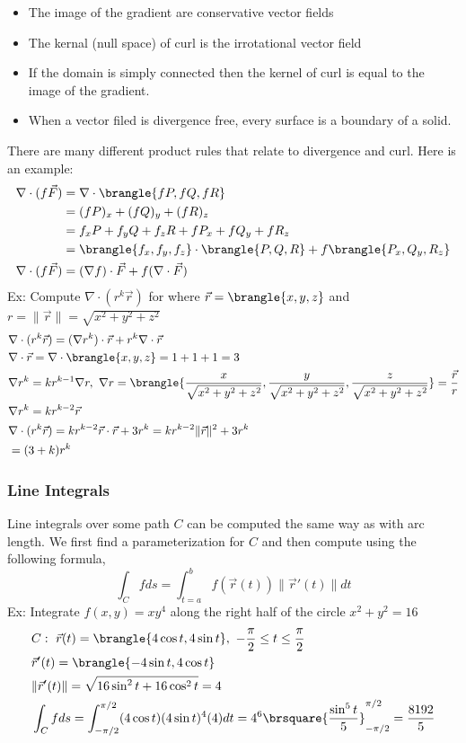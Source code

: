 \begin{itemize}
    \item The image of the gradient are conservative vector fields
    \item The kernal (null space) of curl is the irrotational vector field
    \item If the domain is simply connected then the kernel of curl is equal to the image of the gradient.
    \item When a vector filed is divergence free, every surface is a boundary of a solid.
\end{itemize}
There are many different product rules that relate to divergence and curl. Here is an example:
\begin{align*}
    \nabla\cdot(f\vec{F})&=\nabla\cdot\brangle{fP,fQ,fR}\\
    &=(fP)_x+(fQ)_y+(fR)_z\\
    &=f_xP+f_yQ+f_zR+fP_x+fQ_y+fR_z\\
    &=\brangle{f_x,f_y,f_z}\cdot\brangle{P,Q,R}+f\brangle{P_x,Q_y,R_z}\\
    \nabla\cdot(f\vec{F})&=(\nabla f)\cdot\vec{F}+f(\nabla\cdot\vec{F})
\end{align*}
Ex: Compute $\nabla\cdot(r^k\vec{r})$ for where $\vec{r}=\brangle{x,y,z}$ and $r=\|\vec{r}\|=\sqrt{x^2+y^2+z^2}$
\begin{align*}
    &\nabla\cdot(r^k\vec{r})=(\nabla r^k)\cdot\vec{r}+r^k\nabla\cdot\vec{r}\\
    &\nabla\cdot\vec{r}=\nabla\cdot\brangle{x,y,z}=1+1+1=3\\
    &\nabla r^k=kr^{k-1}\nabla r,\ \nabla r=\brangle{\frac{x}{\sqrt{x^2+y^2+z^2}},\frac{y}{\sqrt{x^2+y^2+z^2}},\frac{z}{\sqrt{x^2+y^2+z^2}}}=\frac{\vec{r}}{r}\\
    &\nabla r^k=kr^{k-2}\vec{r}\\
    &\nabla\cdot(r^k\vec{r})=kr^{k-2}\vec{r}\cdot\vec{r}+3r^k=kr^{k-2}\|\vec{r}\|^2+3r^k\\
    &=(3+k)r^k
\end{align*}
\subsubsection{Line Integrals}
Line integrals over some path $C$ can be computed the same way as with arc length. We first find a parameterization for $C$ and then compute using the following formula,
$$\int_C fds=\int_{t=a}^b f(\vec{r}(t))\|\vec{r}'(t)\|dt$$
Ex: Integrate $f(x,y)=xy^4$ along the right half of the circle $x^2+y^2=16$\\
\begin{align*}
    &C:\ \vec{r}(t)=\brangle{4\cos t,4\sin t},\ -\frac{\pi}{2}\leq t\leq \frac{\pi}{2}\\
    &\vec{r}'(t)=\brangle{-4\sin t,4\cos t}\\
    &\|\vec{r}'(t)\|=\sqrt{16\sin^2t+16\cos^2t}=4\\
    &\int_C fds=\int_{-\pi/2}^{\pi/2}(4\cos t)(4\sin t)^4(4)dt=4^6\brsquare{\frac{\sin^5t}{5}}_{-\pi/2}^{\pi/2}=\frac{8192}{5}
\end{align*}
